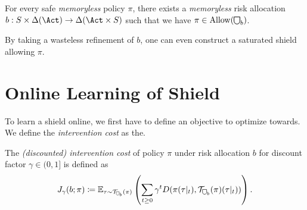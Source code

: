 \documentclass[runningheads]{llncs}
\newcommand{\Distr}{\Delta}
\newcommand{\Allow}{\mathrm{Allow}}
\newcommand\shieldbase{%
  \tikz[baseline=0.2ex] \draw[semithick]
    (0,1.75ex) -- (0,0.75ex)
    arc [radius=0.75ex, start angle=-180, end angle=0]
    -- (1.5ex,1.75ex) -- cycle;%
}
\DeclareRobustCommand\shield{%
  \mathord{\scalerel*{\shieldbase}{\bigcirc}}%
}
\newcommand{\E}{\mathbb{E}}
\newcommand{\T}{\mathcal{T}}
\begin{document}
\begin{corollary}
    For every safe \emph{memoryless} policy \(\pi\), there exists a \emph{memoryless} risk allocation \(b: S \times \Distr(\Act) \rightarrow \Distr(\Act \times S)\) such that we have \(\pi \in \Allow(\shield_{b})\).%
\end{corollary}

\begin{remark}
    By taking a wasteless refinement of \(b\), one can even construct a saturated shield allowing \(\pi\).
\end{remark}



%     

\section{Online Learning of Shield}

To learn a shield online, we first have to define an objective to optimize towards. We define the \emph{intervention cost} as the.

\begin{definition}
    The \emph{(discounted) intervention cost} of policy \(\pi\) under risk allocation \(b\) for discount factor \(\gamma \in (0,1]\) is defined as
    \[
    J_\gamma(b; \pi) \coloneq \E_{\tau \sim \T_{\shield_b}(\pi)} \left(
        \sum_{t \geq 0} \gamma^t D(\pi(\tau|_t), \T_{\shield_b}(\pi)(\tau|_t))
    \right).
    \]
\end{definition}
\end{document}
